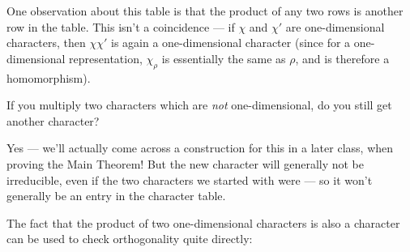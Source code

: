One observation about this table is that the product of any two rows is another row in the table. This isn't a coincidence --- if $\chi$ and $\chi'$ are one-dimensional characters, then $\chi\chi'$ is again a one-dimensional character (since for a one-dimensional representation, $\chi_\rho$ is essentially the same as $\rho$, and is therefore a homomorphism). 

\begin{question}
If you multiply two characters which are \emph{not} one-dimensional, do you still get another character?
\end{question}

\begin{ans}
Yes --- we'll actually come across a construction for this in a later class, when proving the Main Theorem! But the new character will generally not be irreducible, even if the two characters we started with were --- so it won't generally be an entry in the character table. 
\end{ans}

The fact that the product of two one-dimensional characters is also a character can be used to check orthogonality quite directly:



